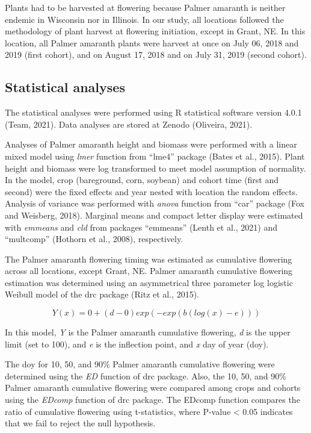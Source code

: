 \documentclass[utf8]{frontiersSCNS}
\begin{document}
Plants had to be harvested at flowering because Palmer amaranth is
neither endemic in Wisconsin nor in Illinois. In our study, all
locations followed the methodology of plant harvest at flowering
initiation, except in Grant, NE. In this location, all Palmer amaranth
plants were harvest at once on July 06, 2018 and 2019 (first cohort),
and on August 17, 2018 and on July 31, 2019 (second cohort).

\hypertarget{statistical-analyses}{%
\subsection*{Statistical analyses}\label{statistical-analyses}}

The statistical analyses were performed using R statistical software
version 4.0.1 (Team, 2021). Data analyses are stored at Zenodo
(Oliveira, 2021).

Analyses of Palmer amaranth height and biomass were performed with a
linear mixed model using \emph{lmer} function from ``lme4'' package
(Bates et al., 2015). Plant height and biomass were log transformed to
meet model assumption of normality. In the model, crop (bareground,
corn, soybean) and cohort time (first and second) were the fixed effects
and year nested with location the random effects. Analysis of variance
was performed with \emph{anova} function from ``car'' package (Fox and
Weisberg, 2018). Marginal means and compact letter display were
estimated with \emph{emmeans} and \emph{cld} from packages ``emmeans''
(Lenth et al., 2021) and ``multcomp'' (Hothorn et al., 2008),
respectively.

The Palmer amaranth flowering timing was estimated as cumulative
flowering across all locations, except Grant, NE. Palmer amaranth
cumulative flowering estimation was determined using an asymmetrical
three parameter log logistic Weibull model of the drc package (Ritz et
al., 2015).

\[Y(x) = 0 + (d-0) exp (-exp(b(log(x)-e)))\]

In this model, \emph{Y} is the Palmer amaranth cumulative flowering,
\emph{d} is the upper limit (set to 100), and \emph{e} is the inflection
point, and \emph{x} day of year (doy).

The doy for 10, 50, and 90\% Palmer amaranth cumulative flowering were
determined using the \emph{ED} function of drc package. Also, the 10,
50, and 90\% Palmer amaranth cumulative flowering were compared among
crops and cohorts using the \emph{EDcomp} function of drc package. The
EDcomp function compares the ratio of cumulative flowering using
t-statistics, where P-value \textless{} 0.05 indicates that we fail to
reject the null hypothesis.
\end{document}
